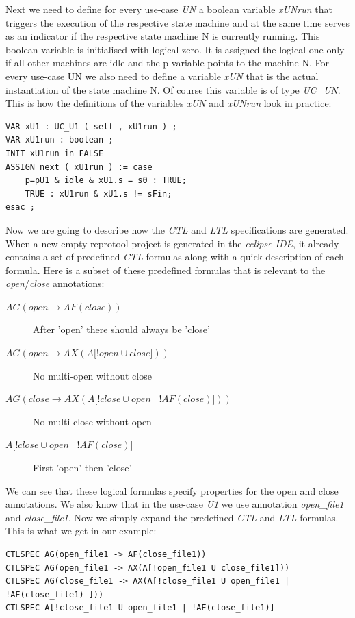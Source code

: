 Next we need to define for every use-case \emph{UN} a boolean variable \emph{xUNrun} that triggers the execution of the respective state machine
and at the same time serves as an indicator if the respective state machine N is currently running. This boolean variable is
initialised with logical zero. It is assigned the logical one only if all other machines are idle and the p variable points to the
machine N. For every use-case UN we also need to define a variable \emph{xUN} that is the actual instantiation of the state machine N.
Of course this variable is of type \emph{UC\_UN}. This is how the definitions of the variables \emph{xUN} and \emph{xUNrun} look in practice:
\begin{lstlisting}
VAR xU1 : UC_U1 ( self , xU1run ) ;
VAR xU1run : boolean ;
INIT xU1run in FALSE
ASSIGN next ( xU1run ) := case
	p=pU1 & idle & xU1.s = s0 : TRUE;
	TRUE : xU1run & xU1.s != sFin;
esac ;
\end{lstlisting}

Now we are going to describe how the \emph{CTL} and \emph{LTL} specifications are generated. When a new empty reprotool project is generated in the
\emph{eclipse IDE}, it already contains a set of predefined \emph{CTL} formulas along with a quick description of each formula. Here is a subset of
these predefined formulas that is relevant to the \emph{open}/\emph{close} annotations:

\begin{description}
 \item [$AG(open \rightarrow AF(close))$] After 'open' there should always be 'close'
 \item [$AG(open \rightarrow AX(A\lbrack!open \cup close\rbrack))$] No multi-open without close
 \item [$AG(close \rightarrow AX(A\lbrack!close \cup open \mid !AF(close) \rbrack))$] No multi-close without open
 \item [$A\lbrack !close \cup open \mid !AF(close)\rbrack$] First 'open' then 'close'
\end{description}

We can see that these logical formulas specify properties for the open and close annotations. We also know that in the use-case \emph{U1} we
use annotation \emph{open\_file1} and \emph{close\_file1}. Now we simply expand the predefined \emph{CTL} and \emph{LTL} formulas. This is what we get in our
example:
\begin{lstlisting}
CTLSPEC AG(open_file1 -> AF(close_file1))
CTLSPEC AG(open_file1 -> AX(A[!open_file1 U close_file1]))
CTLSPEC AG(close_file1 -> AX(A[!close_file1 U open_file1 | !AF(close_file1) ]))
CTLSPEC A[!close_file1 U open_file1 | !AF(close_file1)]
\end{lstlisting}

